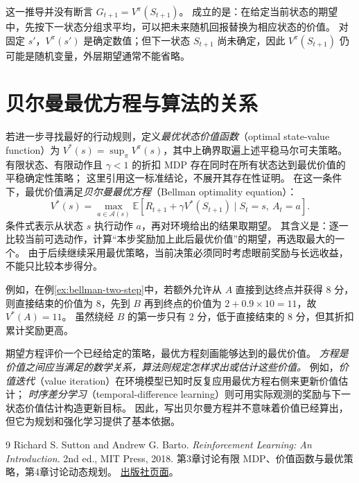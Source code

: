 \documentclass[UTF8,12pt,a4paper,fontset=fandol]{ctexart}
\begin{document}
这一推导并没有断言 $G_{t+1}=V^\pi(S_{t+1})$。
成立的是：在给定当前状态的期望中，先按下一状态分组求平均，可以把未来随机回报替换为相应状态的价值。
对固定 $s'$，$V^\pi(s')$ 是确定数值；但下一状态 $S_{t+1}$ 尚未确定，因此 $V^\pi(S_{t+1})$ 仍可能是随机变量，外层期望通常不能省略。

\section{贝尔曼最优方程与算法的关系}
\label{sec:bellman-optimality}

若进一步寻找最好的行动规则，定义\emph{最优状态价值函数}（optimal state-value function）为
$V^*(s)=\sup_\pi V^\pi(s)$，其中上确界取遍上述平稳马尔可夫策略。
有限状态、有限动作且 $\gamma<1$ 的折扣 MDP 存在同时在所有状态达到最优价值的平稳确定性策略；
这里引用这一标准结论\cite[第3章]{sutton-barto}，不展开其存在性证明。
在这一条件下，最优价值满足\emph{贝尔曼最优方程}（Bellman optimality equation）：
\begin{equation}
  \boxed{
  V^*(s)=\max_{a\in\mathcal A(s)}
  \mathbb E\!\left[
    R_{t+1}+\gamma V^*(S_{t+1})\mid S_t=s,\ A_t=a
  \right].}
  \label{eq:bellman-optimality}
\end{equation}
条件式表示从状态 $s$ 执行动作 $a$，再对环境给出的结果取期望。
其含义是：逐一比较当前可选动作，计算“本步奖励加上此后最优价值”的期望，再选取最大的一个。
由于后续继续采用最优策略，当前决策必须同时考虑眼前奖励与长远收益，不能只比较本步得分。

例如，在例\ref{ex:bellman-two-step}中，若额外允许从 $A$ 直接到达终点并获得 $8$ 分，
则直接结束的价值为 $8$，先到 $B$ 再到终点的价值为 $2+0.9\times10=11$，故 $V^*(A)=11$。
虽然绕经 $B$ 的第一步只有 $2$ 分，低于直接结束的 $8$ 分，但其折扣累计奖励更高。

期望方程评价一个已经给定的策略，最优方程刻画能够达到的最优价值。
\emph{方程是价值之间应当满足的数学关系，算法则规定怎样求出或估计这些价值。}
例如，\emph{价值迭代}（value iteration）在环境模型已知时反复应用最优方程右侧来更新价值估计；
\emph{时序差分学习}（temporal-difference learning）则可用实际观测的奖励与下一状态价值估计构造更新目标。
因此，写出贝尔曼方程并不意味着价值已经算出，但它为规划和强化学习提供了基本依据。

\begin{thebibliography}{9}
Richard S. Sutton and Andrew G. Barto.
\textit{Reinforcement Learning: An Introduction}.
2nd ed., MIT Press, 2018.
第3章讨论有限 MDP、价值函数与最优策略，第4章讨论动态规划。
\href{https://mitpress.mit.edu/9780262039246/reinforcement-learning/}{出版社页面}。
\end{thebibliography}
\end{document}
